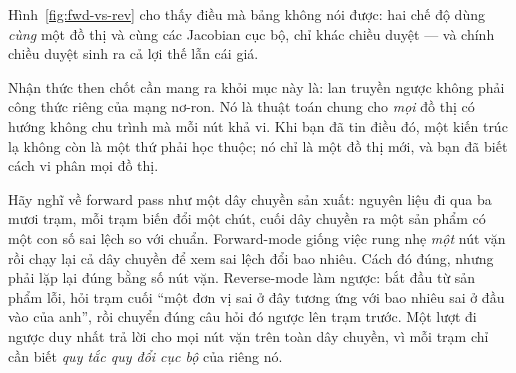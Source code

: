 \documentclass[../../../deep_learning.tex]{subfiles}
\begin{document}
Hình~\ref{fig:fwd-vs-rev} cho thấy điều mà bảng không nói được: hai chế độ dùng \emph{cùng} một đồ thị và cùng các Jacobian cục bộ, chỉ khác chiều duyệt --- và chính chiều duyệt sinh ra cả lợi thế lẫn cái giá.

Nhận thức then chốt cần mang ra khỏi mục này là: lan truyền ngược không phải công thức riêng của mạng nơ-ron. Nó là thuật toán chung cho \emph{mọi} đồ thị có hướng không chu trình mà mỗi nút khả vi. Khi bạn đã tin điều đó, một kiến trúc lạ không còn là một thứ phải học thuộc; nó chỉ là một đồ thị mới, và bạn đã biết cách vi phân mọi đồ thị.

\begin{trucgiac}
Hãy nghĩ về forward pass như một dây chuyền sản xuất: nguyên liệu đi qua ba mươi trạm, mỗi trạm biến đổi một chút, cuối dây chuyền ra một sản phẩm có một con số sai lệch so với chuẩn. Forward-mode giống việc rung nhẹ \emph{một} nút vặn rồi chạy lại cả dây chuyền để xem sai lệch đổi bao nhiêu. Cách đó đúng, nhưng phải lặp lại đúng bằng số nút vặn. Reverse-mode làm ngược: bắt đầu từ sản phẩm lỗi, hỏi trạm cuối ``một đơn vị sai ở đây tương ứng với bao nhiêu sai ở đầu vào của anh'', rồi chuyển đúng câu hỏi đó ngược lên trạm trước. Một lượt đi ngược duy nhất trả lời cho mọi nút vặn trên toàn dây chuyền, vì mỗi trạm chỉ cần biết \emph{quy tắc quy đổi cục bộ} của riêng nó.
\end{trucgiac}
\end{document}
